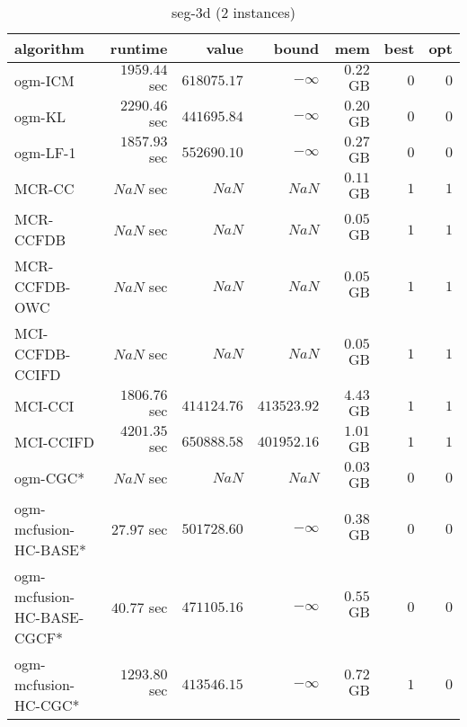 \begin{table}[H]
\scriptsize
\centering
\caption{seg-3d (2 instances)}
\label{tab:smalltable-seg-3d}
\begin{tabular}{lrrrrrr}
\toprule
           algorithm &       runtime     &         value &         bound &           mem &     best &      opt   \\ \midrule 
             ogm-ICM & $      1959.44$ sec & $    618075.17$ & $-\infty$ & $         0.22$ GB & $       0$ & $       0$ \\ 
              ogm-KL & $      2290.46$ sec & $    441695.84$ & $-\infty$ & $         0.20$ GB & $       0$ & $       0$ \\ 
            ogm-LF-1 & $      1857.93$ sec & $    552690.10$ & $-\infty$ & $         0.27$ GB & $       0$ & $       0$ \\ 
\cmidrule{1-1} 
              MCR-CC & $          NaN$ sec & $          NaN$ & $          NaN$ & $         0.11$ GB & $       1$ & $       1$ \\ 
           MCR-CCFDB & $          NaN$ sec & $          NaN$ & $          NaN$ & $         0.05$ GB & $       1$ & $       1$ \\ 
       MCR-CCFDB-OWC & $          NaN$ sec & $          NaN$ & $          NaN$ & $         0.05$ GB & $       1$ & $       1$ \\ 
\cmidrule{1-1} 
     MCI-CCFDB-CCIFD & $          NaN$ sec & $          NaN$ & $          NaN$ & $         0.05$ GB & $       1$ & $       1$ \\ 
             MCI-CCI & $      1806.76$ sec & $    414124.76$ & $    413523.92$ & $         4.43$ GB & $       1$ & $       1$ \\ 
           MCI-CCIFD & $      4201.35$ sec & $    650888.58$ & $    401952.16$ & $         1.01$ GB & $       1$ & $       1$ \\ 
\cmidrule{1-1} 
            ogm-CGC* & $          NaN$ sec & $          NaN$ & $          NaN$ & $         0.03$ GB & $       0$ & $       0$ \\ 
ogm-mcfusion-HC-BASE* & $        27.97$ sec & $    501728.60$ & $-\infty$ & $         0.38$ GB & $       0$ & $       0$ \\ 
ogm-mcfusion-HC-BASE-CGCF* & $        40.77$ sec & $    471105.16$ & $-\infty$ & $         0.55$ GB & $       0$ & $       0$ \\ 
ogm-mcfusion-HC-CGC* & $      1293.80$ sec & $    413546.15$ & $-\infty$ & $         0.72$ GB & $       1$ & $       0$ \\ 

\end{tabular}
\end{table}
